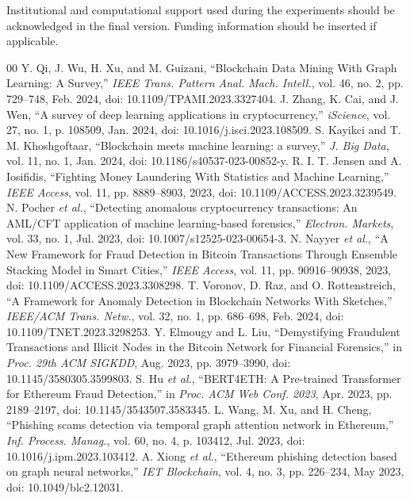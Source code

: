 \documentclass{ieeeaccess}
\begin{document}
Institutional and computational support used during the experiments should be acknowledged in the final version. Funding information should be inserted if applicable.
\begin{thebibliography}{00}
 Y. Qi, J. Wu, H. Xu, and M. Guizani, ``Blockchain Data Mining With Graph Learning: A Survey,'' \emph{IEEE Trans. Pattern Anal. Mach. Intell.}, vol. 46, no. 2, pp. 729--748, Feb. 2024, doi: 10.1109/TPAMI.2023.3327404.
 J. Zhang, K. Cai, and J. Wen, ``A survey of deep learning applications in cryptocurrency,'' \emph{iScience}, vol. 27, no. 1, p. 108509, Jan. 2024, doi: 10.1016/j.isci.2023.108509.
 S. Kayikci and T. M. Khoshgoftaar, ``Blockchain meets machine learning: a survey,'' \emph{J. Big Data}, vol. 11, no. 1, Jan. 2024, doi: 10.1186/s40537-023-00852-y.
 R. I. T. Jensen and A. Iosifidis, ``Fighting Money Laundering With Statistics and Machine Learning,'' \emph{IEEE Access}, vol. 11, pp. 8889--8903, 2023, doi: 10.1109/ACCESS.2023.3239549.
 N. Pocher \emph{et al.}, ``Detecting anomalous cryptocurrency transactions: An AML/CFT application of machine learning-based forensics,'' \emph{Electron. Markets}, vol. 33, no. 1, Jul. 2023, doi: 10.1007/s12525-023-00654-3.
 N. Nayyer \emph{et al.}, ``A New Framework for Fraud Detection in Bitcoin Transactions Through Ensemble Stacking Model in Smart Cities,'' \emph{IEEE Access}, vol. 11, pp. 90916--90938, 2023, doi: 10.1109/ACCESS.2023.3308298.
 T. Voronov, D. Raz, and O. Rottenstreich, ``A Framework for Anomaly Detection in Blockchain Networks With Sketches,'' \emph{IEEE/ACM Trans. Netw.}, vol. 32, no. 1, pp. 686--698, Feb. 2024, doi: 10.1109/TNET.2023.3298253.
 Y. Elmougy and L. Liu, ``Demystifying Fraudulent Transactions and Illicit Nodes in the Bitcoin Network for Financial Forensics,'' in \emph{Proc. 29th ACM SIGKDD}, Aug. 2023, pp. 3979--3990, doi: 10.1145/3580305.3599803.
 S. Hu \emph{et al.}, ``BERT4ETH: A Pre-trained Transformer for Ethereum Fraud Detection,'' in \emph{Proc. ACM Web Conf. 2023}, Apr. 2023, pp. 2189--2197, doi: 10.1145/3543507.3583345.
 L. Wang, M. Xu, and H. Cheng, ``Phishing scams detection via temporal graph attention network in Ethereum,'' \emph{Inf. Process. Manag.}, vol. 60, no. 4, p. 103412, Jul. 2023, doi: 10.1016/j.ipm.2023.103412.
 A. Xiong \emph{et al.}, ``Ethereum phishing detection based on graph neural networks,'' \emph{IET Blockchain}, vol. 4, no. 3, pp. 226--234, May 2023, doi: 10.1049/blc2.12031.

\end{thebibliography}
\end{document}

